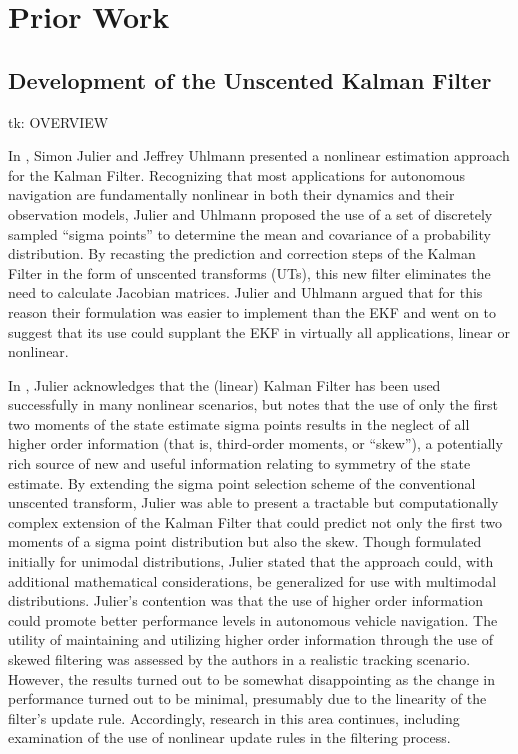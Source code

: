 \chapter{Prior Work}

\section{Development of the Unscented Kalman Filter}

tk: OVERVIEW

In \cite{Julier1997}, Simon Julier and Jeffrey Uhlmann presented a nonlinear estimation approach for the Kalman Filter. Recognizing that most applications for autonomous navigation are fundamentally nonlinear in both their dynamics and their observation models, Julier and Uhlmann proposed the use of a set of discretely sampled ``sigma points'' to determine the mean and covariance of a probability distribution. By recasting the prediction and correction steps of the Kalman Filter in the form of unscented transforms (UTs), this new filter eliminates the need to calculate Jacobian matrices. Julier and Uhlmann argued that for this reason their formulation was easier to implement than the EKF and went on to suggest that its use could supplant the EKF in virtually all applications, linear or nonlinear.

In \cite{Julier1998}, Julier acknowledges that the (linear) Kalman Filter has been used successfully in many nonlinear scenarios, but notes that the use of only the first two moments of the state estimate sigma points results in the neglect of all higher order information (that is, third-order moments, or ``skew''), a potentially rich source of new and useful information relating to symmetry of the state estimate. By extending the sigma point selection scheme of the conventional unscented transform, Julier was able to present a tractable but computationally complex extension of the Kalman Filter that could predict not only the first two moments of a sigma point distribution but also the skew. Though formulated initially for unimodal distributions, Julier stated that the approach could, with additional mathematical considerations, be generalized for use with multimodal distributions. Julier's contention was that the use of higher order information could promote better performance levels in autonomous vehicle navigation. The utility of maintaining and utilizing higher order information through the use of skewed filtering was assessed by the authors in a realistic tracking scenario. However, the results turned out to be somewhat disappointing as the change in performance turned out to be minimal, presumably due to the linearity of the filter's update rule. Accordingly, research in this area continues, including examination of the use of nonlinear update rules in the filtering process.

